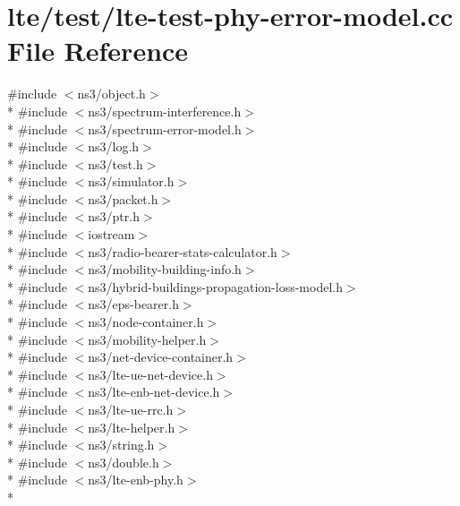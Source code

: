 \hypertarget{lte-test-phy-error-model_8cc}{}\section{lte/test/lte-\/test-\/phy-\/error-\/model.cc File Reference}
\label{lte-test-phy-error-model_8cc}
{\ttfamily \#include $<$ns3/object.\+h$>$}\\*
{\ttfamily \#include $<$ns3/spectrum-\/interference.\+h$>$}\\*
{\ttfamily \#include $<$ns3/spectrum-\/error-\/model.\+h$>$}\\*
{\ttfamily \#include $<$ns3/log.\+h$>$}\\*
{\ttfamily \#include $<$ns3/test.\+h$>$}\\*
{\ttfamily \#include $<$ns3/simulator.\+h$>$}\\*
{\ttfamily \#include $<$ns3/packet.\+h$>$}\\*
{\ttfamily \#include $<$ns3/ptr.\+h$>$}\\*
{\ttfamily \#include $<$iostream$>$}\\*
{\ttfamily \#include $<$ns3/radio-\/bearer-\/stats-\/calculator.\+h$>$}\\*
{\ttfamily \#include $<$ns3/mobility-\/building-\/info.\+h$>$}\\*
{\ttfamily \#include $<$ns3/hybrid-\/buildings-\/propagation-\/loss-\/model.\+h$>$}\\*
{\ttfamily \#include $<$ns3/eps-\/bearer.\+h$>$}\\*
{\ttfamily \#include $<$ns3/node-\/container.\+h$>$}\\*
{\ttfamily \#include $<$ns3/mobility-\/helper.\+h$>$}\\*
{\ttfamily \#include $<$ns3/net-\/device-\/container.\+h$>$}\\*
{\ttfamily \#include $<$ns3/lte-\/ue-\/net-\/device.\+h$>$}\\*
{\ttfamily \#include $<$ns3/lte-\/enb-\/net-\/device.\+h$>$}\\*
{\ttfamily \#include $<$ns3/lte-\/ue-\/rrc.\+h$>$}\\*
{\ttfamily \#include $<$ns3/lte-\/helper.\+h$>$}\\*
{\ttfamily \#include $<$ns3/string.\+h$>$}\\*
{\ttfamily \#include $<$ns3/double.\+h$>$}\\*
{\ttfamily \#include $<$ns3/lte-\/enb-\/phy.\+h$>$}\\*
